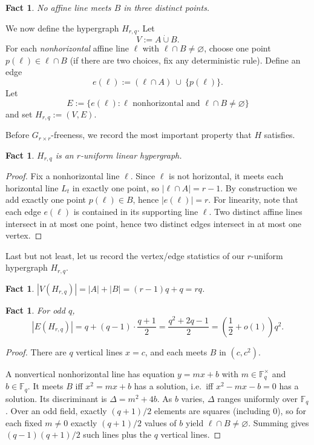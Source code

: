 \documentclass[11pt]{article}
\newtheorem{fact}[theorem]{Fact}
\theoremstyle{definition}
\theoremstyle{remark}
\newcommand{\F}{\mathbb{F}}
\begin{document}
\begin{fact}\label{lem:nothree}
No affine line meets $B$ in three distinct points.
\end{fact}

We now define the hypergraph $H_{r,q}$. Let
\[
V := A\dot\cup B.
\]
For each \emph{nonhorizontal} affine line $\ell$ with $\ell\cap B\neq\varnothing$, choose one point
$p(\ell)\in \ell\cap B$ (if there are two choices, fix any deterministic rule).
Define an edge
\[
e(\ell) := (\ell\cap A)\ \cup\ \{p(\ell)\}.
\]
Let
\[
E:=\{e(\ell): \ell \text{ nonhorizontal and } \ell\cap B\neq\varnothing\}
\]
and set $H_{r,q}:=(V,E)$.

Before $G_{r \times r}$-freeness, we record the most important property that $H$ satisfies. 

\begin{fact}\label{prop:uniformlinear}
$H_{r,q}$ is an $r$-uniform linear hypergraph.
\end{fact}

\begin{proof}
Fix a nonhorizontal line $\ell$. Since $\ell$ is not horizontal, it meets each horizontal line $L_t$ in exactly one
point, so $|\ell\cap A|=r-1$. By construction we add exactly one point $p(\ell)\in B$, hence $|e(\ell)|=r$. For linearity, note that each edge $e(\ell)$ is contained in its supporting line $\ell$.
Two distinct affine lines intersect in at most one point, hence two distinct edges intersect in at most one vertex.
\end{proof}

Last but not least, let us record the vertex/edge statistics of our $r$-uniform hypergraph $H_{r,q}$.

\begin{fact}
$|V(H_{r,q})| = |A|+|B| = (r-1)q + q = rq$.
\end{fact}

\begin{fact}\label{prop:Ecount}
For odd $q$,
\[
|E(H_{r,q})| = q + (q-1)\cdot\frac{q+1}{2} = \frac{q^2+2q-1}{2}
= \left(\frac12+o(1)\right)q^2.
\]
\end{fact}

\begin{proof}
There are $q$ vertical lines $x=c$, and each meets $B$ in $(c,c^2)$.

A nonvertical nonhorizontal line has equation $y=mx+b$ with $m\in\F_q^\times$ and $b\in\F_q$.
It meets $B$ iff $x^2=mx+b$ has a solution, i.e.\ iff $x^2-mx-b=0$ has a solution.
Its discriminant is $\Delta=m^2+4b$. As $b$ varies, $\Delta$ ranges uniformly over $\F_q$.
Over an odd field, exactly $(q+1)/2$ elements are squares (including $0$), so for each fixed $m\neq 0$ exactly
$(q+1)/2$ values of $b$ yield $\ell\cap B\neq\varnothing$.
Summing gives $(q-1)(q+1)/2$ such lines plus the $q$ vertical lines.
\end{proof}
\end{document}
